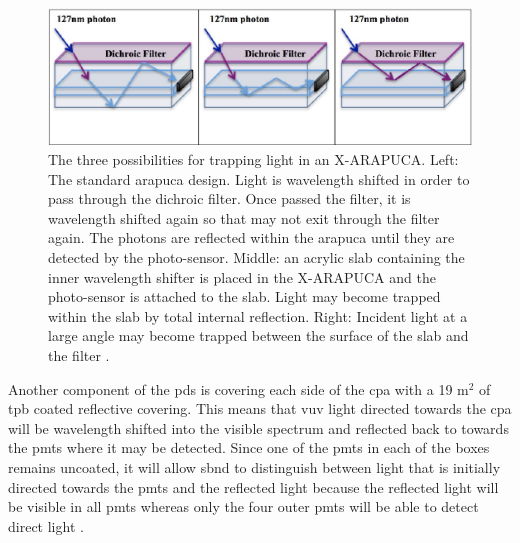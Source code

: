 \begin{figure}[!h]
    \centering
    \includegraphics[width = \hugefigwidth]{figures-chap3/arapuca.png}
    \caption[ARAPUCA operating principle.]{The three possibilities for trapping light in an X-ARAPUCA. Left: The standard \gls{arapuca} design. Light is wavelength shifted in order to pass through the dichroic filter. Once passed the filter, it is wavelength shifted again so that may not exit through the filter again. The photons are reflected within the \gls{arapuca} until they are detected by the photo-sensor. Middle: an acrylic slab containing the inner wavelength shifter is placed in the X-ARAPUCA and the photo-sensor is attached to the slab. Light may become trapped within the slab by total internal reflection. Right: Incident light at a large angle may become trapped between the surface of the slab and the filter \cite{X-ARAPUCA}.}
    \label{fig:arapuca}
\end{figure}

Another component of the \gls{pds} is covering each side of the \gls{cpa} with a 19 m$^2$ of \gls{tpb} coated reflective covering. This means that \gls{vuv} light directed towards the \gls{cpa} will be wavelength shifted into the visible spectrum and reflected back to towards the \glspl{pmt} where it may be detected. Since one of the \glspl{pmt} in each of the boxes remains uncoated, it will allow \gls{sbnd} to distinguish between light that is initially directed towards the \glspl{pmt} and the reflected light because the reflected light will be visible in all \glspl{pmt} whereas only the four outer \glspl{pmt} will be able to detect direct light \cite{LArTPC_review}. 

